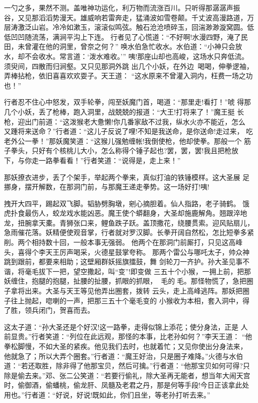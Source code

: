 一勺之多，果然不测。盖唯神功运化，利万物而流涨百川。只听得那潺潺声振
谷，又见那滔滔势漫天。雄威响若雷奔走，猛涌波如雪卷颠。千丈波高漫路道，万
层涛激泛山岩。冷冷如漱玉，滚滚似鸣弦。触石沧沧喷碎玉，回湍渺渺漩窝圆。低
低凹凹随流荡，满涧平沟上下连。
行者见了心慌道：“不好啊!水漫四野，淹了民田，未曾灌在他的洞里，曾奈之何？”
唤水伯急忙收水。水伯道：“小神只会放水，却不会收水。常言道：‘泼水难收。’”
咦!那座山却也高峻，这场水只奔低流。须臾间，四散而归涧壑。又只见那洞外跳
出几个小妖，在外边喝喝，伸拳逻袖，弄棒拈枪，依旧喜喜欢欢耍子。天王道：
“这水原来不曾灌入洞内，枉费一场之功也！”

行者忍不住心中怒发，双手轮拳，闯至妖魔门首，喝道：“那里走!看打！”唬
得那几个小妖，丢了枪棒，跑入洞里，战兢兢的报道：“大王!打将来了！”魔王挺
长枪，迎出门前道：“这泼猴老大惫懒!你几番家敌不过我，纵水火亦不能近，怎么
又踵将来送命？”行者道：“这儿子反说了哩!不知是我送命，是你送命!走过来，
吃老外公一拳！”那妖魔笑道：“这猴儿强勉缠帐!我倒使枪，他却使拳。那般一个
筋子拳头，只好有个核桃儿大小，怎么称得个锤子起也?罢，罢，罢!我且把枪放
下，与你走一路拳看看！”行者笑道：“说得是，走上来！”

那妖撩衣进步，丢了个架手，举起两个拳来，真似打油的铁锤模样。这大圣展
足挪身，摆开解数，在那洞门前，与那魔王递走拳势。这一场好打!咦!

拽开大四平，踢起双飞脚。韬胁劈胸墩，剜心摘胆着。仙人指路，老子骑鹤。
饿虎扑食最伤人，蛟龙戏水能凶恶。魔王使个蟒翻身，大圣却施鹿解角。翘跟淬地
龙，扭腕拿天橐。青狮张口来，鲤鱼跌子跃。盖顶撒花，绕腰贯索。迎风贴扇儿，
急雨催花落。妖精便使观音掌，行者就对罗汉脚。长拳开阔自然松，怎比短拳多紧
削。两个相持数十回，一般本事无强弱。
他两个在那洞门前厮打，只见这高峰头，喜得个李天王厉声喝采，火德星鼓掌夸称。
那两个雷公与哪吒太子，帅众神跳到跟前，都要来相助；这壁厢群妖摇旗擂鼓，舞
剑轮刀一齐护。孙大圣见事不谐，将毫毛拔下一把，望空撒起，叫“变”!即变做
三五十个小猴，一拥上前，把那妖缠住，抱腿的抱腿，扯腰的扯腰，抓眼的抓眼，
毛的毛。那怪物慌了，急把圈子拿将出来。大圣与天王等见他弄出圈套，拨转
云头，走上高峰逃阵。那妖把圈子往上抛起，唿喇的一声，把那三五十个毫毛变的
小猴收为本相，套入洞中，得了胜，领兵闭门，贺喜而去。

这太子道：“孙大圣还是个好汉!这一路拳，走得似锦上添花；使分身法，正是
人前显贵。”行者笑道：“列位在此远观，那怪的本事，比老孙如何？”李天王道：
“他拳松脚慢，不如大圣的紧疾。他见我们去时，也就着忙；又见你使出分身法来，
他就急了；所以大弄个圈套。”行者道：“魔王好治，只是圈子难降。”火德与水伯
道：“若还取胜，除非得了他那宝贝，然后可擒。”行者道：“他那宝贝如何可得?只
除是偷去来。”邓、张二公笑道：“若要行偷礼，除大圣再无能者，想当年大闹天宫
时，偷御酒，偷蟠桃，偷龙肝、凤髓及老君之丹，那是何等手段!今日正该拿此处
用也。”行者道：“好说，好说!既如此，你们且坐，等老孙打听去来。”

